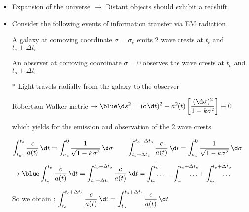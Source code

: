 \onecolumn
\begin{itemize}
\item Expansion of the universe $\rightarrow$ Distant objects should exhibit a redshift
\item Consider the following events of information transfer via EM radiation
\item[] A galaxy at comoving coordinate $\sigma=\sigma_{e}$ emits 2 wave crests
        at $t_{e}$ and $t_{e}+\Delta t_{e}$
\item[] An observer at comoving coordinate $\sigma=0$ observes the wave crests
        at $t_{o}$ and $t_{o}+\Delta t_{o}$
\item[$\ast$] Light travels radially from the galaxy to the observer
\item[] Robertson-Walker metric
        $\displaystyle \rightarrow
        {\blue \d s^{2}=(c\,\d t)^{2}-a^{2}(t)\left[\frac{(\d\sigma)^{2}}{1-k\sigma^{2}}\right] \equiv 0}$
\item[] which yields for the emission and observation of the 2 wave crests
\item[] $\displaystyle \int_{t_{e}}^{t_{o}} \frac{c}{a(t)}\,\d t
         = \int_{\sigma_{e}}^{0} \frac{1}{\sqrt{1-k\sigma^{2}}}\,\d\sigma \qquad
         \int_{t_{e}+\Delta t_{e}}^{t_{o}+\Delta t_{o}} \frac{c}{a(t)}\,\d t
         = \int_{\sigma_{e}}^{0} \frac{1}{\sqrt{1-k\sigma^{2}}}\,\d\sigma$\\
\item[] $\displaystyle \rightarrow {\blue \int_{t_{e}}^{t_{o}} \frac{c}{a(t)}\,\d t =
         \int_{t_{e}+\Delta t_{e}}^{t_{o}+\Delta t_{o}} \frac{c}{a(t)}\,\d t =
         \int_{t_{e}}^{t_{o}} \!\!\!\ldots -
         \int_{t_{e}}^{t_{e}+\Delta t_{e}} \!\!\!\!\!\!\!\!\!\ldots +
         \int_{t_{o}}^{t_{o}+\Delta t_{o}} \!\!\!\!\!\!\!\!\!\ldots}$
\item[] So we obtain : {\red $\displaystyle \int_{t_{e}}^{t_{e}+\Delta t_{e}} \frac{c}{a(t)}\,\d t =
        \int_{t_{o}}^{t_{o}+\Delta t_{o}} \frac{c}{a(t)}\,\d t$}
\end{itemize}

